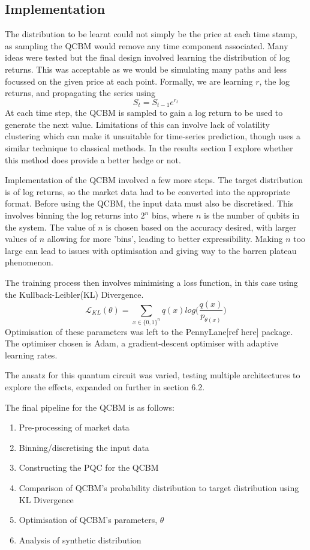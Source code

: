 \documentclass[12pt]{article}
\newcommand{\newp}
    {
    \vskip 0.5cm 
  }
\numberwithin{equation}{section}
\begin{document}
\subsection{Implementation}
The distribution to be learnt could not simply be the price at each time stamp, 
as sampling the QCBM would remove any time component associated. Many ideas were tested 
but the final design involved learning the distribution of log returns. This was 
acceptable as we would be simulating many paths and less focussed on the given 
price at each point. Formally, we are learning $r$, the log returns, and propagating 
the series using 
\begin{equation}
  S_t = S_{t-1}e^{r_t}
\end{equation}
At each time step, the QCBM is sampled to gain a log return to be used to generate 
the next value. Limitations of this can involve lack of volatility clustering which 
can make it unsuitable for time-series prediction, though uses a similar technique 
to classical methods. In the results section I explore whether this method does 
provide a better hedge or not.
\newp
Implementation of the QCBM involved a few more steps. The target distribution 
is of log returns, so the market data had to be converted into the appropriate 
format. Before using the QCBM, the input data must also be discretised. This 
involves binning the log returns into $2^n$ bins, where $n$ is the number of 
qubits in the system. The value of $n$ is chosen based on the accuracy desired, 
with larger values of $n$ allowing for more 'bins', leading to better expressibility.
Making $n$ too large can lead to issues with optimisation and giving way to the 
barren plateau phenomenon.
\newp
The training process then involves minimising a loss function, in this case using 
the Kullback-Leibler(KL) Divergence. 
\begin{equation}
\mathcal{L}_{KL}(\theta) = \sum_{x \in \{0,1\}^n}q(x)log\bigl( \frac{q(x)}{p_{\theta(x)}}\bigr)
\end{equation}
Optimisation of these parameters was left to the PennyLane[ref here] package. 
The optimiser chosen is Adam, a gradient-descent optimiser with adaptive 
learning rates.
\newp
The ansatz for this quantum circuit was varied, testing multiple architectures
to explore the effects, expanded on further in section 6.2.
\newp
The final pipeline for the QCBM is as follows:
\begin{enumerate}
  \item Pre-processing of market data
  \item Binning/discretising the input data
  \item Constructing the PQC for the QCBM
  \item Comparison of QCBM's probability distribution to target distribution using
  KL Divergence
  \item Optimisation of QCBM's parameters, $\theta$
  \item Analysis of synthetic distribution
\end{enumerate}
\end{document}
